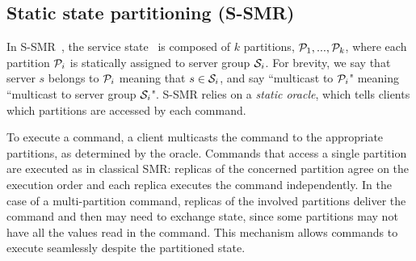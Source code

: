 \subsection{Static state partitioning (S-SMR)}
\label{sec:ssmr}

In S-SMR~\cite{bezerra2014ssmr}, the service state \vvt\ is composed of $k$ partitions, $\mathcal{P}_1, ..., \mathcal{P}_k$, where each partition $\mathcal{P}_i$ is statically assigned to server group $\mathcal{S}_i$. 
For brevity, we say that server $s$ belongs to $\mathcal{P}_i$ meaning that $s \in \mathcal{S}_i$, and say ``multicast to $\mathcal{P}_i$" meaning ``multicast to server group $\mathcal{S}_i$".
S-SMR relies on a \emph{static oracle}, which tells clients which partitions are accessed by each command.

To execute a command, a client multicasts the command to the appropriate partitions, as determined by the oracle.
Commands that access a single partition are executed as in classical SMR: replicas of the concerned partition agree on the execution order and each replica executes the command independently.
In the case of a multi-partition command, replicas of the involved partitions deliver the command and then may need to exchange state, since some partitions may not have all the values read in the command.
This mechanism allows commands to execute seamlessly despite the partitioned state.

%


